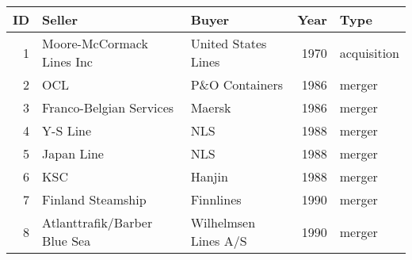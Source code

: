 
\begin{tabular}[t]{rllrl}
\toprule
ID & Seller & Buyer & Year & Type\\
\midrule
1 & Moore-McCormack Lines Inc & United States Lines & 1970 & acquisition\\
2 & OCL & P\&O Containers & 1986 & merger\\
3 & Franco-Belgian Services & Maersk & 1986 & merger\\
4 & Y-S Line & NLS & 1988 & merger\\
5 & Japan Line & NLS & 1988 & merger\\
6 & KSC & Hanjin & 1988 & merger\\
7 & Finland Steamship & Finnlines & 1990 & merger\\
8 & Atlanttrafik/Barber Blue Sea & Wilhelmsen Lines A/S & 1990 & merger\\
\bottomrule
\end{tabular}
